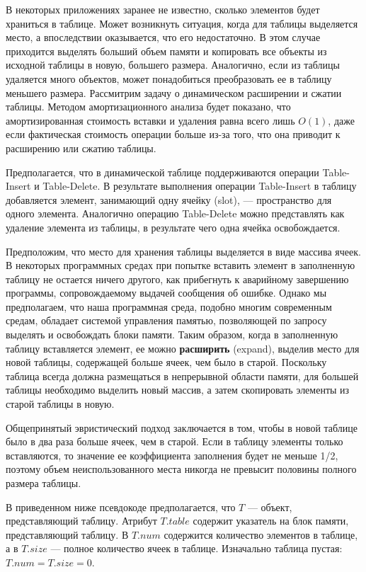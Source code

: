 В некоторых приложениях заранее не известно, сколько элементов будет храниться в таблице.
Может возникнуть ситуация, когда для таблицы выделяется место, а впоследствии оказывается, что его недостаточно.
В этом случае приходится выделять больший объем памяти и копировать все объекты из исходной таблицы в новую, большего размера.
Аналогично, если из таблицы удаляется много объектов, может понадобиться преобразовать ее в таблицу меньшего размера.
Рассмитрим задачу о динамическом расширении и сжатии таблицы.
Методом амортизационного анализа будет показано, что амортизированная стоимость вставки и удаления равна всего лишь $O(1)$, даже если фактическая стоимость операции больше из-за того, что она приводит к расширению или сжатию таблицы.

Предполагается, что в динамической таблице поддерживаются операции
Table-Insert и Table-Delete.
В результате выполнения операции Table-Insert в таблицу добавляется элемент, занимающий одну ячейку (slot), --- пространство для одного элемента.
Аналогично операцию Table-Delete можно представлять как удаление элемента из таблицы, в результате чего одна ячейка освобождается.

Предположим, что место для хранения таблицы выделяется в виде массива ячеек. В некоторых программных средах при попытке вставить элемент в заполненную таблицу не остается ничего другого, как прибегнуть к аварийному завершению программы, сопровождаемому выдачей сообщения об ошибке.
Однако мы предполагаем, что наша программная среда, подобно многим современным средам, обладает системой управления памятью, позволяющей по запросу выделять и освобождать блоки памяти.
Таким образом, когда в заполненную таблицу вставляется элемент, ее можно \textbf{расширить} (expand), выделив место для новой таблицы, содержащей больше ячеек, чем было в старой.
Поскольку таблица всегда должна размещаться в непрерывной области памяти, для большей таблицы необходимо выделить новый массив, а затем скопировать элементы из старой таблицы в новую.

Общепринятый эвристический подход заключается в том, чтобы в новой таблице было в два раза больше ячеек, чем в старой.
Если в таблицу элементы только вставляются, то значение ее коэффициента заполнения будет не меньше 1/2, поэтому объем неиспользованного места никогда не превысит половины полного
размера таблицы.

В приведенном ниже псевдокоде предполагается, что $T$ --- объект, представляющий таблицу.
Атрибут $T.table$ содержит указатель на блок памяти, представляющий таблицу.
В $T.num$ содержится количество элементов в таблице, а в $T.size$ --- полное количество ячеек в таблице.
Изначально таблица пустая: $T. num = T. size = 0$.

